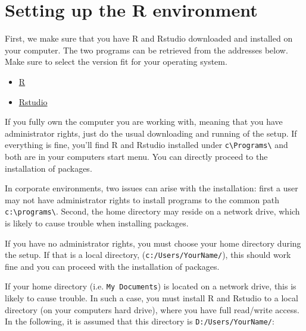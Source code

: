 \documentclass[]{svmono}
\providecommand{\tightlist}{%
  \setlength{\itemsep}{0pt}\setlength{\parskip}{0pt}}
\theoremstyle{definition}
\theoremstyle{definition}
\theoremstyle{definition}
\theoremstyle{remark}
\begin{document}
\section{Setting up the R
environment}\label{setting-up-the-r-environment}

First, we make sure that you have R and Rstudio downloaded and installed
on your computer. The two programs can be retrieved from the addresses
below. Make sure to select the version fit for your operating system.

\begin{itemize}
\tightlist
\item
  \href{http://www.r-project.org}{R}
\item
  \href{http://www.rstudio.com}{Rstudio}
\end{itemize}

If you fully own the computer you are working with, meaning that you
have administrator rights, just do the usual downloading and running of
the setup. If everything is fine, you'll find R and Rstudio installed
under \texttt{c\textbackslash{}Programs\textbackslash{}} and both are in
your computers start menu. You can directly proceed to the installation
of packages.

In corporate environments, two issues can arise with the installation:
first a user may not have administrator rights to install programs to
the common path \texttt{c:\textbackslash{}programs\textbackslash{}}.
Second, the home directory may reside on a network drive, which is
likely to cause trouble when installing packages.

If you have no administrator rights, you must choose your home directory
during the setup. If that is a local directory,
(\texttt{c:/Users/YourName/}), this should work fine and you can proceed
with the installation of packages.

If your home directory (i.e. \texttt{My\ Documents}) is located on a
network drive, this is likely to cause trouble. In such a case, you must
install R and Rstudio to a local directory (on your computers hard
drive), where you have full read/write access. In the following, it is
assumed that this directory is \texttt{D:/Users/YourName/}:
\end{document}
